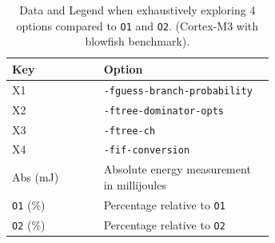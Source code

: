 \documentclass[twocolumn]{article}
\let\oldcaption\caption
\renewcommand{\caption}[1]{\oldcaption{\textup{#1}}}
\begin{document}
\begin{table}[tb]
	\begin{tabular}{l p{0.65\linewidth}}
		\bfseries Key & \bfseries Option \\
		\hline
		X1 & \texttt{-fguess-branch-probability}  \\
		X2 & \texttt{-ftree-dominator-opts}  \\
		X3 & \texttt{-ftree-ch} \\
		X4 & \texttt{-fif-conversion} \\
		Abs (mJ) & Absolute energy measurement in millijoules \\
		\texttt{O1} (\%) & Percentage relative to \texttt{O1} \\
		\texttt{O2} (\%) & Percentage relative to \texttt{O2} \\
	\end{tabular}
	\caption{Data and Legend when exhaustively exploring 4 options compared to \texttt{O1} and \texttt{O2}. (Cortex-M3 with blowfish benchmark).}
	\label{Table:Exhaustive}
\end{table}
\end{document}
